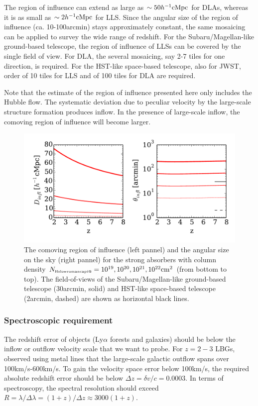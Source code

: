 \documentclass[useAMS,usenatbib,twocolumn]{mn2e}
\makeatletter
\newcommand{\Rmnum}[1]{\expandafter\@slowromancap\romannumeral #1@}
\newcommand{\LyA}{\mbox{Ly}\alpha}
\newcommand{\NHI}{N_{\mbox{\tiny H\Rmnum{1}}}}
\makeatother
\begin{document}
The region of influence can extend as large as $\sim50h^{-1}\rm{cMpc}$ for
DLAs, whereas it is as small as $\sim2h^{-1}\rm{cMpc}$ for LLS. Since the 
angular size of the region of influence (ca. 10-100arcmin) stays approximately 
constant, the same mosaicing can be applied to survey the wide range of redshift.
For the Subaru/Magellan-like ground-based telescope, the region of influence of
LLSs can be covered by the single field of view. For DLA, the several mosaicing,
say 2-7 tiles for one direction, is required. For the HST-like space-based telescope, 
also for JWST, order of 10 tiles for LLS and of 100 tiles for DLA are required.

Note that the estimate of the region of influence presented here only includes 
the Hubble flow. The systematic deviation due to peculiar velocity by the large-scale
structure formation produces inflow. In the presence of large-scale inflow,
the comoving region of influence will become larger.
 
\begin{figure}
 \begin{center}
  \includegraphics[angle=0,width=\columnwidth]{figure/region_of_influence.pdf}
  \caption{The comoving region of influence (left pannel) and the angular size on the sky 
  (right pannel) for the strong absorbers with column density 
  $\NHI=10^{19},10^{20},10^{21},10^{22}\rm{cm}^2$
  (from bottom to top). The field-of-views of the Subaru/Magellan-like ground-based 
  telescope (30arcmin, solid) and HST-like space-based telescope (2arcmin, dashed) 
  are shown as horizontal black lines.}
 \end{center}
\end{figure}

\subsubsection{Spectroscopic requirement}
The redshift error of objects ($\LyA$ forests and galaxies) should
be below the inflow or outflow velocity scale that we want to probe.
For $z=2-3$ LBGs, \cite{2010ApJ...717..289S} observed using metal lines that the large-scale
galactic outflow spans over 100km/s-600km/s. To gain the velocity space error
below 100km/s, the required absolute redshift error should be below 
$\Delta z=\delta v/c=0.0003$. In terms of spectroscopy, the spectral
resolution should exceed $R=\lambda/\Delta\lambda=(1+z)/\Delta z\approx
3000(1+z)$.
\end{document}
